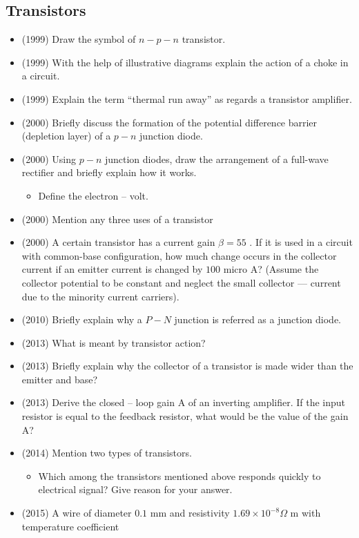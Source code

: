 \documentclass{article}
\begin{document}
\subsection{Transistors}
\begin{itemize}
\item (1999)  Draw the symbol of $ n-p-n$ transistor.
\item (1999)  With the help of illustrative diagrams explain the action of a choke in a circuit.
\item (1999)  Explain the term “thermal run away” as regards a transistor amplifier.
\item (2000)  Briefly discuss the formation of the potential difference barrier (depletion layer) of a $ p-n$ junction diode.
\item (2000)  Using $ p-n$ junction diodes, draw the arrangement of a full-wave rectifier and briefly explain how it works.\begin{itemize}
\item Define the electron – volt.
\end{itemize}
\item (2000)  Mention any three uses of a transistor
\item (2000)  A certain transistor has a current gain $  \beta =55$ . If it is used in a circuit with common-base configuration, how much change occurs in the collector current if an emitter current is changed by $ 100$ micro A? (Assume the collector potential to be constant and neglect the small collector — current due to the minority current carriers).
\item (2010)  Briefly explain why a $ P-N$ junction is referred as a junction diode.
\item (2013)  What is meant by transistor action?
\item (2013)  Briefly explain why the collector of a transistor is made wider than the emitter and base?
\item (2013)  Derive the closed – loop gain A of an inverting amplifier.  If the input resistor is equal to the feedback resistor, what would be the value of the gain A?
\item (2014)  Mention two types of transistors.\begin{itemize}
\item Which among the transistors mentioned above responds quickly to electrical signal? Give reason for your answer.
\end{itemize}
\item (2015)  A wire of diameter $ 0.1$ mm and resistivity $ 1.69\times10^{-8}\Omega$ m with temperature coefficient\begin{itemize}

\end{itemize}
\end{itemize}
\end{document}
